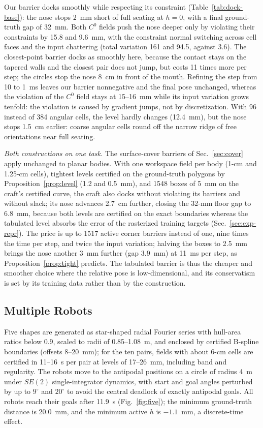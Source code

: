 \documentclass[journal]{IEEEtran}
\theoremstyle{definition}
\begin{document}
Our barrier docks smoothly while respecting its constraint (Table~\ref{tab:dock-base}): the nose
stops 2~mm short of full seating at $h=0$, with a final ground-truth gap of 32~mm. Both $C^0$
fields push the nose deeper only by violating their constraints by 15.8 and 9.6~mm, with the
constraint normal switching across cell faces and the input chattering (total variation 161 and
94.5, against 3.6). The closest-point barrier docks as smoothly here, because the contact stays on
the tapered walls and the closest pair does not jump, but costs 11 times more per step; the circles
stop the nose 8~cm in front of the mouth. Refining the step from 10 to 1~ms leaves our barrier
nonnegative and the final pose unchanged, whereas the violation of the $C^0$ field stays at
15--16~mm while its input variation grows tenfold: the violation is caused by gradient jumps, not
by discretization. With 96 instead of 384 angular cells, the level hardly changes (12.4~mm), but the
nose stops 1.5~cm earlier: coarse angular cells round off the narrow ridge of free orientations near
full seating.

\emph{Both constructions on one task.} The surface-cover barriers of Sec.~\ref{sec:cover} apply
unchanged to planar bodies. With one workspace field per body (1-cm and 1.25-cm cells), tightest
levels certified on the ground-truth polygons by Proposition~\ref{prop:level} (1.2 and 0.5~mm), and
1548 boxes of 5~mm on the craft's certified curve, the craft also docks without violating its barriers
and without slack; its nose advances 2.7~cm further, closing the 32-mm floor gap to 6.8~mm, because
both levels are certified on the exact boundaries whereas the tabulated level absorbs the error of the
rasterized training targets (Sec.~\ref{sec:exp-repr}). The price is up to 1517 active corner barriers
instead of one, nine times the time per step, and twice the input variation; halving the boxes to
2.5~mm brings the nose another 3~mm further (gap 3.9~mm) at 11~ms per step, as
Proposition~\ref{prop:tight} predicts. The tabulated barrier is thus the cheaper and smoother choice
where the relative pose is low-dimensional, and its conservatism is set by its training data rather
than by the construction.

\subsection{Multiple Robots}\label{sec:exp-five}
Five shapes are generated as star-shaped radial Fourier series with hull-area ratios below 0.9,
scaled to radii of 0.85--1.08~m, and enclosed by certified B-spline boundaries (offsets 8--20~mm);
for the ten pairs, fields with about 6-cm cells are certified in 11--16~s per pair at levels of
17--26~mm, including band and regularity. The robots move to the antipodal positions on a circle of
radius 4~m under $SE(2)$ single-integrator dynamics, with start and goal angles perturbed by up to
$9^\circ$ and $20^\circ$ to avoid the central deadlock of exactly antipodal goals. All robots reach
their goals after 11.9~s (Fig.~\ref{fig:five}); the minimum ground-truth distance is 20.0~mm, and the
minimum active $h$ is $-1.1$~mm, a discrete-time effect.
\end{document}
